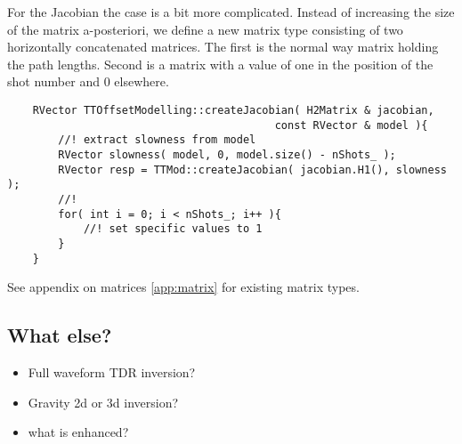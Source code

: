 For the Jacobian the case is a bit more complicated.
Instead of increasing the size of the matrix a-posteriori, we define a new matrix type  consisting of two horizontally concatenated matrices.
The first is the normal way matrix holding the path lengths.
Second is a matrix with a value of one in the position of the shot number and 0 elsewhere.

\begin{lstlisting}
    RVector TTOffsetModelling::createJacobian( H2Matrix & jacobian, 
                                          const RVector & model ){
        //! extract slowness from model
        RVector slowness( model, 0, model.size() - nShots_ );
        RVector resp = TTMod::createJacobian( jacobian.H1(), slowness );
        //! 
        for( int i = 0; i < nShots_; i++ ){
            //! set specific values to 1
        }
    }
\end{lstlisting}

See appendix on matrices \ref{app:matrix} for existing matrix types.

\subsection{What else?}
\begin{itemize}
	\item Full waveform TDR inversion?
	\item Gravity 2d or 3d inversion?
	\item what is enhanced?
\end{itemize}
